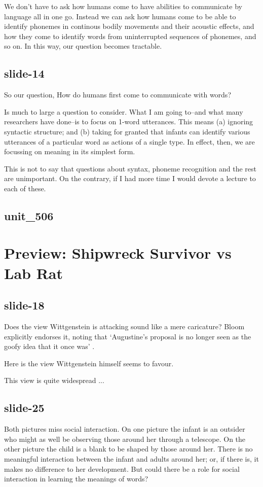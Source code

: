 \documentclass[12pt,\papersize]{extarticle}
\begin{document}
We don't have to ask how humans come to have abilities to communicate by language all in one go.
Instead we can ask how humans come to be able to identify phonemes in continous bodily movements and their acoustic effects, and how they come to identify words from uninterrupted sequences of phonemes, and so on.
In this way, our question becomes tractable.
 
\subsection{slide-14}
So our question,
How do humans first come to communicate with words?
 
Is much to large a question to consider.
What I am going to--and what many researchers have done--is to focus on 1-word utterances.
This means (a) ignoring syntactic structure; and (b) taking for granted that infants can 
identify various utterances of a particular word as actions of a single type.
In effect, then, we are focussing on meaning in its simplest form.
 
This is not to say that questions about syntax, phoneme recognition and the rest are 
unimportant.  On the contrary, if I had more time I would devote a lecture to each of these.
 
\subsection{unit\_506}
 
 
\section{Preview: Shipwreck Survivor vs Lab Rat}
 
\subsection{slide-18}
Does the view Wittgenstein is attacking sound like a mere caricature?  Bloom explicitly endorses it, noting that ‘Augustine’s proposal is no longer seen as the goofy idea that it once was’ \citep[p.\ 61]{Bloom:2000qz}.
 
Here is the view Wittgenstein himself seems to favour.
 
This view is quite widespread ...
 
\subsection{slide-25}
Both pictures miss social interaction.
On one picture the infant is an outsider who might as well be observing those around her through a telescope.
On the other picture the child is a blank to be shaped by those around her.
There is no meaningful interaction between the infant and adults around her; or, if there is, it makes no difference to her development.
But could there be a role for social interaction in learning the meanings of words?
 
\end{document}
